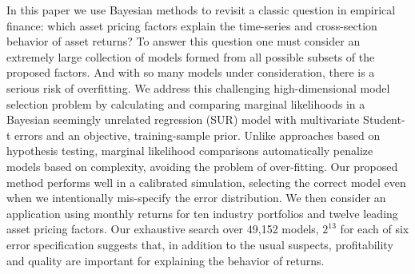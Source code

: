 In this paper we use Bayesian methods to revisit a classic question in empirical finance: which asset pricing factors explain the time-series and cross-section behavior of asset returns? 
To answer this question one must consider an extremely large collection of models formed from all possible subsets of the proposed factors.
And with so many models under consideration, there is a serious risk of overfitting.
We address this challenging high-dimensional model selection problem by calculating and comparing marginal likelihoods in a Bayesian seemingly unrelated regression (SUR) model with multivariate Student-t errors and an objective, training-sample prior.
Unlike approaches based on hypothesis testing, marginal likelihood comparisons automatically penalize models based on complexity, avoiding the problem of over-fitting. 
Our proposed method performs well in a calibrated simulation, selecting the correct model even when we intentionally mis-specify the error distribution.
We then consider an application using monthly returns for ten industry portfolios and twelve leading asset pricing factors.
Our exhaustive search over 49,152 models, $2^{13}$ for each of six error specification suggests that, in addition to the usual suspects, profitability and quality are important for explaining the behavior of returns.

